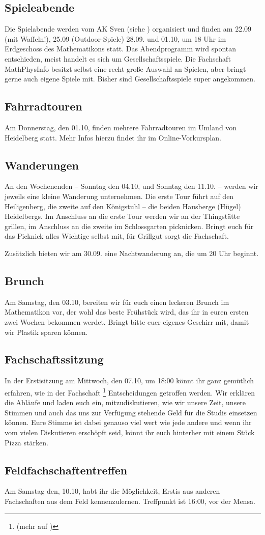 \subsection{Spieleabende}
Die Spielabende werden vom AK Sven (siehe ) organisiert und finden am 22.09 (mit Waffeln!), 25.09 (Outdoor-Spiele) 28.09. und 01.10, um 18 Uhr im Erdgeschoss des \gls{Mathematikon}s statt. Das Abendprogramm wird spontan entschieden, meist handelt es sich um Gesellschaftsspiele. Die Fachschaft MathPhysInfo besitzt selbst eine recht große Auswahl an Spielen, aber bringt gerne auch eigene Spiele mit. Bisher sind Gesellschaftsspiele super angekommen.

\subsection{Fahrradtouren}
Am Donnerstag, den 01.10, finden mehrere Fahrradtouren im Umland von Heidelberg statt. Mehr Infos hierzu findet ihr im Online-Vorkursplan.

\subsection{Wanderungen}
An den Wochenenden -- Sonntag den 04.10, und Sonntag den 11.10. -- werden wir jeweils eine kleine Wanderung unternehmen. Die erste Tour führt auf den Heiligenberg, die zweite auf den Königstuhl -- die beiden Hausberge (Hügel) Heidelbergs. Im Anschluss an die erste Tour werden wir an der Thingstätte grillen, im Anschluss an die zweite im Schlossgarten picknicken. Bringt euch für das Picknick alles Wichtige selbst mit, für Grillgut sorgt die Fachschaft.

Zusätzlich bieten wir am 30.09. eine Nachtwanderung an, die um 20 Uhr beginnt.

\subsection{Brunch}
Am Samstag, den 03.10, bereiten wir für euch einen leckeren Brunch im \gls{Mathematikon} vor, der wohl das beste Frühstück wird, das ihr in euren ersten zwei Wochen bekommen werdet. Bringt bitte euer eigenes Geschirr mit, damit wir Plastik sparen können.

\subsection{Fachschaftssitzung}
In der Erstisitzung am Mittwoch, den 07.10, um 18:00 könnt ihr ganz gemütlich erfahren, wie in der Fachschaft \footnote{(mehr auf )} Entscheidungen getroffen werden. Wir erklären die Abläufe und laden euch ein, mitzudiskutieren, wie wir unsere Zeit, unsere Stimmen und auch das uns zur Verfügung stehende Geld für die Studis einsetzen können. Eure Stimme ist dabei genauso viel wert wie jede andere und wenn ihr vom vielen Diskutieren erschöpft seid, könnt ihr euch hinterher mit einem Stück Pizza stärken.

\subsection{Feldfachschaftentreffen}
Am Samstag den, 10.10, habt ihr die Möglichkeit, Erstis aus anderen Fachschaften aus dem Feld kennenzulernen. Treffpunkt ist 16:00, vor der Mensa.


